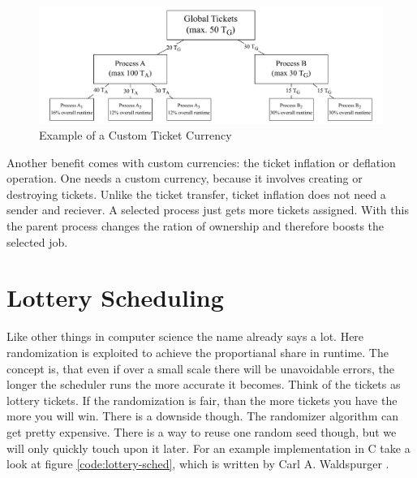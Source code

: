 \begin{figure}[h]
    \centering
    \includegraphics[width=\textwidth]{Assets/Ticket-Currency.pdf}
    \caption{Example of a Custom Ticket Currency}
    \label{fig:ticket-currencies}
\end{figure}
 
Another benefit comes with custom currencies: the ticket inflation or deflation operation.
One needs a custom currency, because it involves creating or destroying tickets. 
Unlike the ticket transfer, ticket inflation does not need a sender and reciever.
A selected process just gets more tickets assigned.
With this the parent process changes the ration of ownership and therefore boosts the selected job.


\section{Lottery Scheduling}

Like other things in computer science the name already says a lot. 
Here randomization is exploited to achieve the proportianal share in runtime.
The concept is, that even if over a small scale there will be unavoidable errors, the longer the scheduler runs the more accurate it becomes.
Think of the tickets as lottery tickets.
If the randomization is fair, than the more tickets you have the more you will win.
There is a downside though.
The randomizer algorithm can get pretty expensive.
There is a way to reuse one random seed though, but we will only quickly touch upon it later.
For an example implementation in C take a look at figure \ref{code:lottery-sched}, which is written by Carl A. Waldspurger \cite{waldspurger95}.

\newpage

